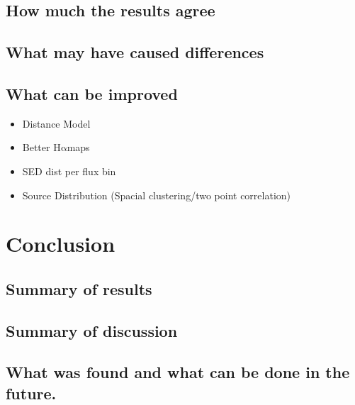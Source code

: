 \documentclass[a4paper, 10pt]{article}
\def\halpha{$\mathrm{H\alpha}$\;}
\begin{document}
\subsection{How much the results agree}
\subsection{What may have caused differences}

\subsection{What can be improved}
\begin{itemize}
    \item Distance Model
    \item Better \halpha maps
    \item SED dist per flux bin
    \item Source Distribution (Spacial clustering/two point correlation)
\end{itemize}
\section{Conclusion}
\subsection{Summary of results}
\subsection{Summary of discussion}
\subsection{What was found and what can be done in the future.}




\end{document}

